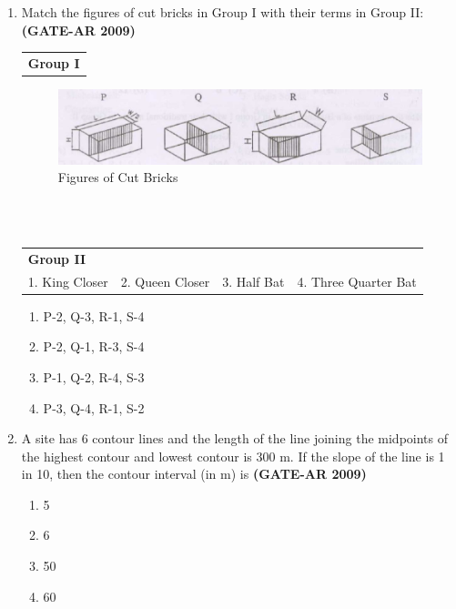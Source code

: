 \documentclass[a4paper,10pt]{article}
\begin{document}
\begin{enumerate}
    \item Match the figures of cut bricks in Group I with their terms in Group II: \hfill \textbf{(GATE-AR 2009)} \\
    \begin{tabular}{ l }
	\textbf{Group I} \\
	\end{tabular}
	\begin{figure}[h!]
        \centering
        \includegraphics[width=0.5\linewidth]{figs/img_01.jpg}
	\caption{Figures of Cut Bricks}
	\label{fig:1}
    \end{figure} \\
     \\
	\begin{tabular}{ l l l l }
	\textbf{Group II} & & & \\
	1. King Closer & 2. Queen Closer & 3. Half Bat & 4. Three Quarter Bat \\
	\end{tabular}
	\begin{multicols}{2}
	\begin{enumerate}
        \item P-2, Q-3, R-1, S-4
        \item P-2, Q-1, R-3, S-4
        \item P-1, Q-2, R-4, S-3
        \item P-3, Q-4, R-1, S-2
    \end{enumerate}
	\end{multicols}

    \item A site has 6 contour lines and the length of the line joining the midpoints of the highest contour and lowest contour is 300 m. If the slope of the line is 1 in 10, then the contour interval (in m) is \hfill \textbf{(GATE-AR 2009)}
    \begin{multicols}{4}
	\begin{enumerate}
        \item 5
        \item 6
        \item 50
        \item 60
    \end{enumerate}
	\end{multicols}
	

\end{enumerate}
\end{document}
